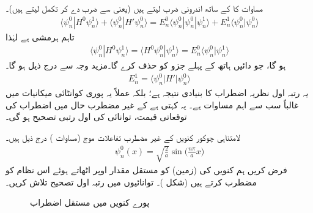 مساوات  کا  کے ساتھ اندرونی ضرب لیتے ہیں (یعنی  سے ضرب دے کر تکمل لیتے ہیں)۔ 
\begin{align*}
\langle \psi_n^0 | H^0 \psi_n^1 \rangle + \langle \psi_n^0 | H' \psi_n^0 \rangle = E_n^0 \langle \psi_n^0 | \psi_n^0 | \psi_n^1 \rangle + E_n^1 \langle \psi_n^0 | \psi_n^0 \rangle
\end{align*}
تاہم  ہرمشی ہے لہٰذا
\begin{align*}
\langle \psi_n^0 | H^0 \psi_n^1 \rangle = \langle H^0 \psi_n^0 | \psi_n^1 \rangle = E_n^0 \langle \psi_n^0 | \psi_n^1 \rangle
\end{align*}
 ہو گا، جو دائیں ہاتھ کے پہلے جزو کو حذف کرے گا۔مزید  
وجہ سے درج ذیل ہو گا۔
\begin{align}\label{مساوات_غیر_اضطراب_اہم_ترین}
E_n^1 = \langle \psi_n^0 | H' | \psi_n^0 \rangle
\end{align}
یہ رتبہ اول نظریہ اضطراب کا بنیادی نتیجہ ہے؛ بلکہ عملاً یہ پوری کوانٹائی میکانیات میں غالباً سب سے اہم مساوات ہے۔ یہ کہتی ہے کے غیر مضطرب حال میں اضطراب کی توقعاتی قیمت، توانائی کی اول رتبی تصحیح ہو گی۔ 

لامتناہی چوکور کنویں کے غیر مضطرب تفاعلات موج (مساوات ) درج ذیل ہیں۔
\begin{align*}
\psi_n^0 (x) = \sqrt{\frac{2}{a}} \sin \big (\frac{n \pi}{a} x\big )
\end{align*}
 فرض کریں ہم کنویں کی  (زمین) کو مستقل مقدار  اوپر اٹھاتے ہوئے اس نظام کو مضطرب کرتے ہیں (شکل )۔ توانائیوں میں رتبہ اول تصحیح تلاش کریں۔

\begin{figure}
\centering
{}
\caption{پورے کنویں میں مستقل اضطراب}
\label{شکل_غیر_تابع_اضطراب_چکور_مستقل_اضطراب}
\end{figure}

